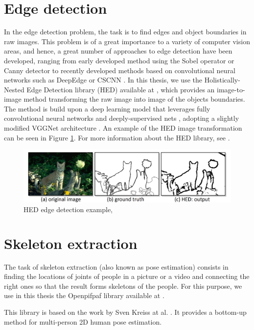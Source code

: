 \section{Edge detection}\label{tb:edge_detection}
In the edge detection problem, the task is to find edges and object boundaries in raw images. This problem is of a great importance to a variety of computer vision areas, and hence, a great number of approaches to edge detection have been developed, ranging from early developed method using the Sobel operator \cite{sobel} or Canny detector \cite{canny} to recently developed methods based on convolutional neural networks such as DeepEdge \cite{deepedge} or CSCNN \cite{cscnn}. In this thesis, we use the Holistically-Nested Edge Detection library (HED) available at \cite{xie15hed}, which provides an image-to-image method transforming the raw image into image of the objects boundaries. The method is build upon a deep learning model that leverages fully convolutional neural networks and deeply-supervised nets \cite{deeply_supervised_nets}, adopting a slightly modified VGGNet architecture \cite{vgg}. An example of the HED image transformation can be seen in Figure \ref{fig:hed}. For more information about the HED library, see \cite{xie15hed}.

\begin{figure}[h!]
    \centering
    \includegraphics[scale=0.22]{figures/HED.png}
    \caption{HED edge detection example, \cite{xie15hed}}
    \label{fig:hed}
\end{figure}

\section{Skeleton extraction}\label{tb:joints_location}
The task of skeleton extraction (also known as pose estimation) consists in finding the locations of joints of people in a picture or a video and connecting the right ones so that the result forms skeletons of the people. For this purpose, we use in this thesis the Openpifpaf library available at \cite{openpifpaf}.

This library is based on the work by Sven Kreiss at al. \cite{openPifPaf_paper}. It provides a bottom-up method for multi-person 2D human pose estimation. 


